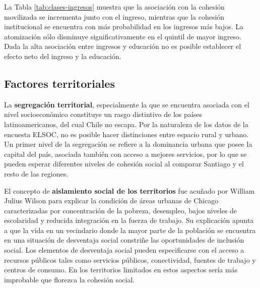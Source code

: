\documentclass[
  12pt,
]{book}
\begin{document}
\begin{table}

\caption{\label{tab:clases-ingresos}Efecto de los quintiles de ingreso sobre las clases de cohesion social}
\centering
{}
\end{table}

La Tabla \ref{tab:clases-ingresos} muestra que la asociación con la cohesión movilizada se incrementa junto con el ingreso, mientras que la cohesión institucional se encuentra con más probabilidad en los ingresos más bajos. La atomización sólo disminuye significativamente en el quintil de mayor ingreso. Dada la alta asociación entre ingresos y educación no es posible establecer el efecto neto del ingreso y la educación.

\hypertarget{factores-territoriales}{%
\subsection{Factores territoriales}\label{factores-territoriales}}

La \textbf{segregación territorial}, especialmente la que se encuentra asociada con el nivel socioeconómico constituye un rasgo distintivo de los países latinoamericanos, del cual Chile no escapa. Por la naturaleza de los datos de la encuesta ELSOC, no es posible hacer distinciones entre espacio rural y urbano. Un primer nivel de la segregación se refiere a la dominancia urbana que posee la capital del país, asociada también con acceso a mejores servicios, por lo que se pueden esperar diferentes niveles de cohesión social al comparar Santiago y el resto de las regiones.

El concepto de \textbf{aislamiento social de los territorios} fue acuñado por William Julius Wilson para explicar la condición de áreas urbanas de Chicago caracterizadas por concentración de la pobreza, desempleo, bajos niveles de escolaridad y reducida integración en la fuerza de trabajo. Su explicación apunta a que la vida en un vecindario donde la mayor parte de la población se encuentra en una situación de desventaja social constriñe las oportunidades de inclusión social. Los elementos de desventaja social pueden especificarse con el acceso a recursos públicos tales como servicios públicos, conectividad, fuentes de trabajo y centros de consumo. En los territorios limitados en estos aspectos sería más improbable que florezca la cohesión social.
\end{document}

